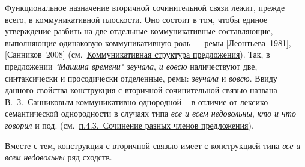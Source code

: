 Функциональное назначение вторичной сочинительной связи лежит, прежде
всего, в коммуникативной плоскости. Оно состоит в том, чтобы единое
утверждение разбить на две отдельные коммуникативные составляющие,
выполняющие одинаковую коммуникативную роль --- ремы
{[}Леонтьева~1981{]}, {[}Санников~2008{]}
(см.~\underline{Коммуникативная структура предложения}). Так, в
предложении \textit{"Машина времени" звучала}, \textit{и вовсю} наличествуют
две, синтаксически и просодически отделенные, ремы: \textit{звучала} и
\textit{вовсю}. Ввиду данного свойства конструкция с вторичной
сочинительной связью названа В.~З.~Санниковым коммуникативно однородной
-- в отличие от лексико-семантической однородности в случаях типа
\textit{все и всем недовольны}, \textit{кто и что говорил} и под.
(см.~\underline{п.4.3.~Сочинение разных членов предложения}).

Вместе с тем, конструкция с вторичной связью имеет с конструкцией типа
\textit{все и всем} \textit{недовольны} ряд сходств.

